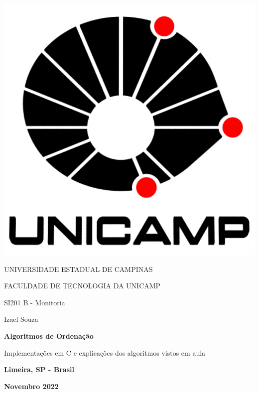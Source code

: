 \thispagestyle{empty}

\noindent\begin{minipage}{0.3\textwidth}
    \includegraphics[scale=0.15]{assets/logo-unicamp.pdf}
\end{minipage}
\hfill
\begin{minipage}{0.6\textwidth}\raggedleft
    UNIVERSIDADE ESTADUAL DE CAMPINAS

    FACULDADE DE TECNOLOGIA DA UNICAMP
    
    SI201 B - Monitoria
    
    Izael Souza
\end{minipage}
\begin{center}
    \hfill%
\end{center}

\begin{center}
    \textbf{\huge Algoritmos de Ordenação}

    \LARGE Implementações em C e explicações dos algoritmos vistos em aula
    
\end{center}

\vspace*{\fill}
\begin{center}
    \textbf{Limeira, SP - Brasil}
    
    \textbf{Novembro 2022}
\end{center}
